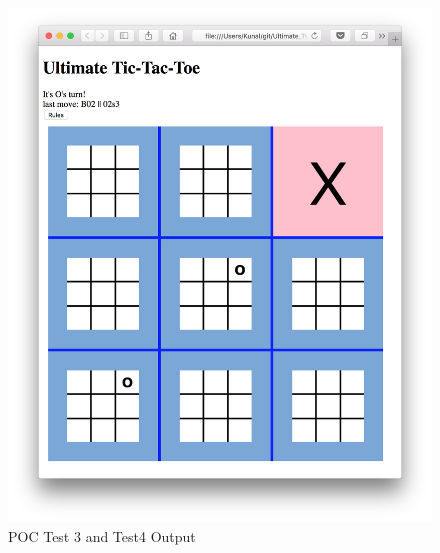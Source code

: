 \documentclass[12pt, titlepage]{article}
\begin{document}
\begin{figure}
  \includegraphics[width=\linewidth]{Figures/Test3-4-output.png}
  \caption{POC Test 3 and Test4 Output}
  \label{fig:Test3_Test4_output}
\end{figure}
\end{document}

